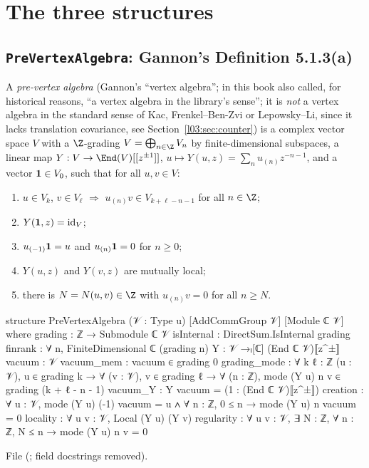 \section{The three structures}\label{l03:sec:axioms}

\subsection{\texttt{PreVertexAlgebra}: Gannon's Definition 5.1.3(a)}

\begin{definition}\label{l03:def:VA}
A \emph{pre-vertex algebra} (Gannon's ``vertex algebra''; in this book also called, for historical reasons, ``a
vertex algebra in the library's sense''; it is \emph{not} a vertex algebra in the standard sense of Kac, Frenkel--Ben-Zvi or Lepowsky--Li, since it lacks
translation covariance, see Section~\ref{l03:sec:counter}) is a complex vector space $V$ with a
$\Z$-grading $V = \bigoplus_{n\in\Z}V_n$ by finite-dimensional subspaces, a linear map
$Y:V\to\End(V)[[z^{\pm1}]]$, $u\mapsto Y(u,z) = \sum_nu_{(n)}z^{-n-1}$, and a vector
$\mathbf{1}\in V_0$, such that for all $u,v\in V$:
\begin{enumerate}[label=(VA\arabic*)]
\item $u\in V_k$, $v\in V_\ell$ $\Rightarrow$ $u_{(n)}v\in V_{k+\ell-n-1}$ for all $n\in\Z$;
\item $Y(\mathbf{1},z) = \mathrm{id}_V$;
\item $u_{(-1)}\mathbf{1} = u$ and $u_{(n)}\mathbf{1} = 0$ for $n\ge0$;
\item $Y(u,z)$ and $Y(v,z)$ are mutually local;
\item there is $N = N(u,v)\in\Z$ with $u_{(n)}v = 0$ for all $n\ge N$.
\end{enumerate}
\end{definition}

\begin{leancode}
structure PreVertexAlgebra (𝒱 : Type u) [AddCommGroup 𝒱] [Module ℂ 𝒱] where
  grading : ℤ → Submodule ℂ 𝒱
  isInternal : DirectSum.IsInternal grading
  finrank : ∀ n, FiniteDimensional ℂ (grading n)
  Y : 𝒱 →ₗ[ℂ] (End ℂ 𝒱)⟦z^±⟧
  vacuum : 𝒱
  vacuum_mem : vacuum ∈ grading 0
  grading_mode : ∀ {k ℓ : ℤ} (u : 𝒱), u ∈ grading k → ∀ (v : 𝒱), v ∈ grading ℓ →
    ∀ (n : ℤ), mode (Y u) n v ∈ grading (k + ℓ - n - 1)
  vacuum_Y : Y vacuum = (1 : (End ℂ 𝒱)⟦z^±⟧)
  creation : ∀ u : 𝒱, mode (Y u) (-1) vacuum = u ∧ ∀ n : ℤ, 0 ≤ n → mode (Y u) n vacuum = 0
  locality : ∀ u v : 𝒱, Local (Y u) (Y v)
  regularity : ∀ u v : 𝒱, ∃ N : ℤ, ∀ n : ℤ, N ≤ n → mode (Y u) n v = 0
\end{leancode}
File  (;
field docstrings removed).

